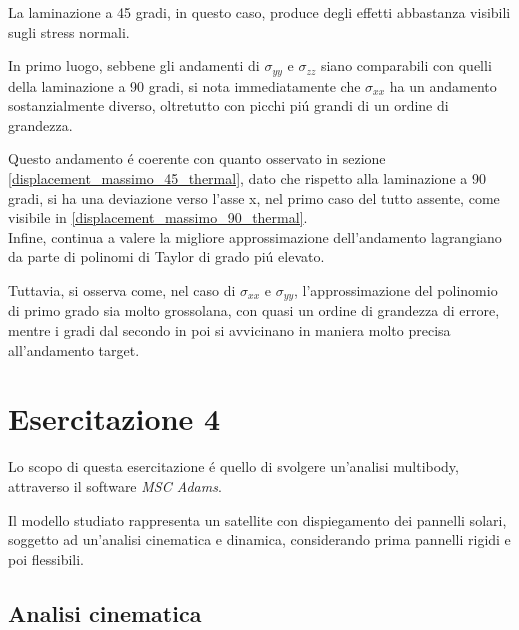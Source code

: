 \documentclass{article}
\begin{document}
            La laminazione a 45 gradi, in questo caso, produce degli effetti abbastanza visibili 
            sugli stress normali. 

            In primo luogo, sebbene gli andamenti di $\sigma_{yy}$ e $\sigma_{zz}$ siano comparabili con quelli della laminazione a 90 gradi, si nota immediatamente che 
            $\sigma_{xx}$ ha un andamento sostanzialmente diverso, oltretutto con picchi piú grandi di un ordine di grandezza. 

            Questo andamento é coerente con quanto osservato in sezione \ref{displacement_massimo_45_thermal}, dato che rispetto alla laminazione
            a 90 gradi, si ha una deviazione verso l'asse x, nel primo caso del tutto assente, come visibile in \ref{displacement_massimo_90_thermal}. \\ 

            Infine, continua a valere la migliore approssimazione dell'andamento lagrangiano da parte di polinomi di Taylor 
            di grado piú elevato.

            Tuttavia, si osserva come, nel caso di $\sigma_{xx}$ e $\sigma_{yy}$, l'approssimazione del polinomio di primo grado
            sia molto grossolana, con quasi un ordine di grandezza di errore, mentre i gradi dal secondo in poi si avvicinano in maniera
            molto precisa all'andamento target.
            


            \clearpage            
        
        \section{Esercitazione 4\label{Esercitazione4}}

        Lo scopo di questa esercitazione é quello di svolgere un'analisi multibody, attraverso il software \textit{MSC Adams}.

        Il modello studiato rappresenta un satellite con dispiegamento dei pannelli solari, soggetto ad un'analisi cinematica e dinamica, 
        considerando prima pannelli rigidi e poi flessibili.

        \subsection{Analisi cinematica\label{analisi_cinematica}}
\end{document}
